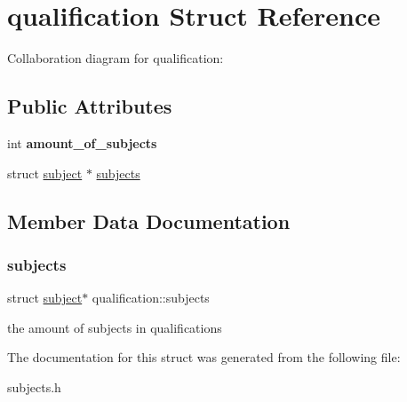\hypertarget{structqualification}{}\section{qualification Struct Reference}
\label{structqualification}


Collaboration diagram for qualification\+:
\subsection*{Public Attributes}
\begin{DoxyCompactItemize}
\item 
\mbox{\label{structqualification_a4eb2ae542b852c954bd4a6e6eca1fb87}} 
int {\bfseries amount\+\_\+of\+\_\+subjects}
\item 
struct \hyperlink{structsubject}{subject} $\ast$ \hyperlink{structqualification_aaa12bc20ddf86ab9297ab4dd06cd774f}{subjects}
\end{DoxyCompactItemize}


\subsection{Member Data Documentation}
\mbox{\label{structqualification_aaa12bc20ddf86ab9297ab4dd06cd774f}} 
\subsubsection{\texorpdfstring{subjects}{subjects}}
{\footnotesize\ttfamily struct \hyperlink{structsubject}{subject}$\ast$ qualification\+::subjects}

the amount of subjects in qualifications 

The documentation for this struct was generated from the following file\+:\begin{DoxyCompactItemize}
\item 
subjects.\+h\end{DoxyCompactItemize}

